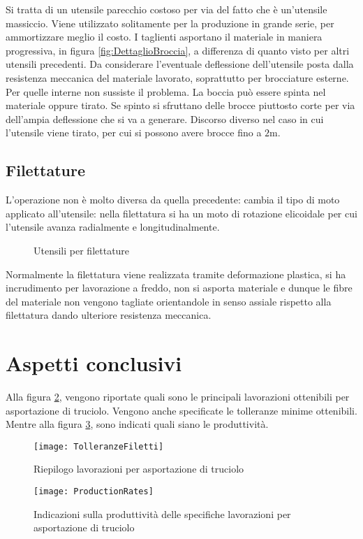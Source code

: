 Si tratta di un utensile parecchio costoso per via del fatto che è un'utensile massiccio. Viene utilizzato solitamente per la produzione in grande serie, per ammortizzare meglio il costo.
I taglienti asportano il materiale in maniera progressiva, in figura \ref{fig:DettaglioBroccia}, a differenza di quanto visto per altri utensili precedenti.
Da considerare l'eventuale deflessione dell'utensile posta dalla resistenza
meccanica del materiale lavorato, soprattutto per brocciature esterne.
Per quelle interne non sussiste il problema.
La boccia può essere spinta nel materiale oppure tirato.
Se spinto si sfruttano delle brocce piuttosto corte per via dell'ampia
deflessione che si va a generare.
Discorso diverso nel caso in cui l'utensile viene tirato, per cui si possono avere brocce fino a $2\unit{\m}$.

\subsection{Filettature}
L'operazione non è molto diversa da quella precedente: cambia il tipo di moto applicato all'utensile: nella filettatura si ha un moto di rotazione
elicoidale per cui l'utensile avanza radialmente e longitudinalmente.

\begin{figure}
\centering
{}\quad
{}
\caption{Utensili per filettature}
\label{fig:Filettature}
\end{figure}

Normalmente la filettatura viene realizzata tramite deformazione plastica,
si ha incrudimento per lavorazione a freddo, non si asporta materiale e dunque le fibre del materiale non vengono tagliate orientandole in senso
assiale rispetto alla filettatura dando ulteriore resistenza meccanica.

\section{Aspetti conclusivi}
Alla figura \ref{fig:TolleranzeFiletti}, vengono riportate quali sono le principali lavorazioni ottenibili per asportazione di truciolo. Vengono anche specificate le tolleranze minime ottenibili.
Mentre alla figura \ref{fig:ProductionRates}, sono indicati quali siano le produttività.
\begin{figure}
\centering
\texttt{[image: TolleranzeFiletti]}
\caption{Riepilogo lavorazioni per asportazione di truciolo}
\label{fig:TolleranzeFiletti}
\end{figure}
\begin{figure}
\centering
\texttt{[image: ProductionRates]}
\caption{Indicazioni sulla produttività delle specifiche lavorazioni per asportazione di truciolo}
\label{fig:ProductionRates}
\end{figure}

